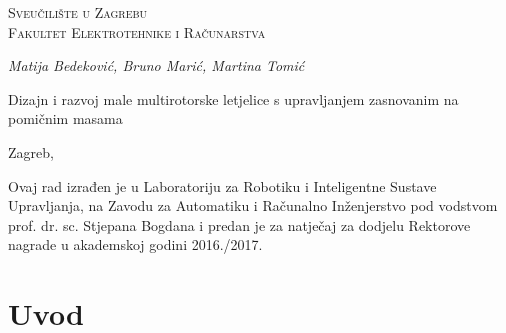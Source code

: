 \documentclass[11pt,a4paper]{article}
\begin{document}
\begin{titlepage}


\center

\textsc{\huge Sveučilište u Zagrebu} \\
\textsc{\huge Fakultet Elektrotehnike i Računarstva}

\vspace*{\fill}
\emph{\large Matija Bedeković, Bruno Marić, Martina Tomić}\\
\vspace{0.5cm}
\begin{Huge}
	Dizajn i razvoj male multirotorske letjelice s upravljanjem zasnovanim na pomičnim masama
\end{Huge}
\vspace*{\fill}

Zagreb, \the\year



\newpage
\thispagestyle{empty}
\vspace*{\fill}
\begin{large}
	Ovaj rad izrađen je u Laboratoriju za Robotiku i Inteligentne Sustave Upravljanja, na Zavodu za Automatiku i Računalno Inženjerstvo pod vodstvom prof. dr. sc. Stjepana Bogdana i predan je za natječaj za dodjelu Rektorove nagrade u akademskoj godini 2016./2017.
	\end{large}
\vspace*{\fill}
\end{titlepage}



\renewcommand{\cftsecleader}{\cftdotfill{\cftdotsep}}
\newpage
\tableofcontents
\thispagestyle{empty}
\newpage
\listoffigures
\thispagestyle{empty}
\newpage
\listoftables
\thispagestyle{empty}




\newpage
\section{Uvod}

\end{document}

